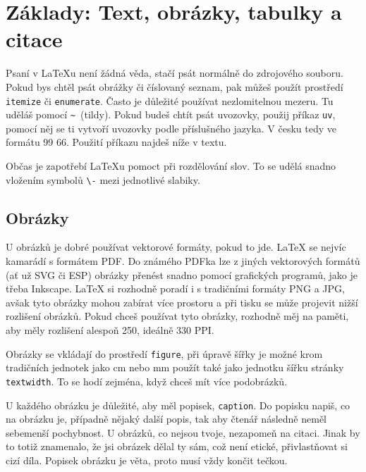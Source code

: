\documentclass[12pt, a4paper,
    twoside,        %
    openright
]{report}
\begin{document}
\section[Základy]{Základy: Text, obrázky, tabulky a citace} %
Psaní v \LaTeX{u} není žádná věda, stačí psát normálně do zdrojového souboru. Pokud bys chtěl psát obrážky či číslovaný seznam, pak můžeš použít prostředí \texttt{itemize} či \texttt{enumerate}. Často je důležité používat nezlomitelnou mezeru. Tu uděláš pomocí \verb|~|~(tildy). Pokud budeš chtít psát uvozovky, použij příkaz \texttt{uv}, pomocí něj se ti vytvoří uvozovky podle příslušného jazyka. V česku tedy ve formátu 99 66. Použití příkazu najdeš níže v textu.

Občas je zapotřebí \LaTeX{u} pomoct při rozdělování slov. To se udělá snadno vložením symbolů \verb|\-| mezi jednotlivé slabiky.

\subsection{Obrázky}

U obrázků je dobré používat vektorové formáty, pokud to jde. \LaTeX{ }se nejvíc kamarádí s formátem PDF. Do známého PDFka lze z jiných vektorových formátů (ať už SVG či ESP) obrázky přenést snadno pomocí grafických programů, jako je třeba Inkscape. \LaTeX{ }si rozhodně poradí i s tradičními formáty PNG a JPG, avšak tyto obrázky mohou zabírat více prostoru a při tisku se může projevit nižší rozlišení obrázků. Pokud chceš používat tyto obrázky, rozhodně měj na paměti, aby měly rozlišení alespoň 250, ideálně 330 PPI.

Obrázky se vkládají do prostředí \texttt{figure}, při úpravě šířky je možné krom tradičních jednotek jako cm nebo mm použít také jako jednotku šířku stránky \texttt{textwidth}. To se hodí zejména, když chceš mít více podobrázků.

U každého obrázku je důležité, aby měl popisek, \texttt{caption}. Do popisku napiš, co na obrázku je, případně nějaký další popis, tak aby čtenář následně neměl sebemenší pochybnost. U obrázků, co nejsou tvoje, nezapomeň na citaci. Jinak by to totiž znamenalo, že jsi obrázek dělal ty sám, což není etické, přivlastňovat si cizí díla. Popisek obrázku je věta, proto musí vždy končit tečkou.
\end{document}

